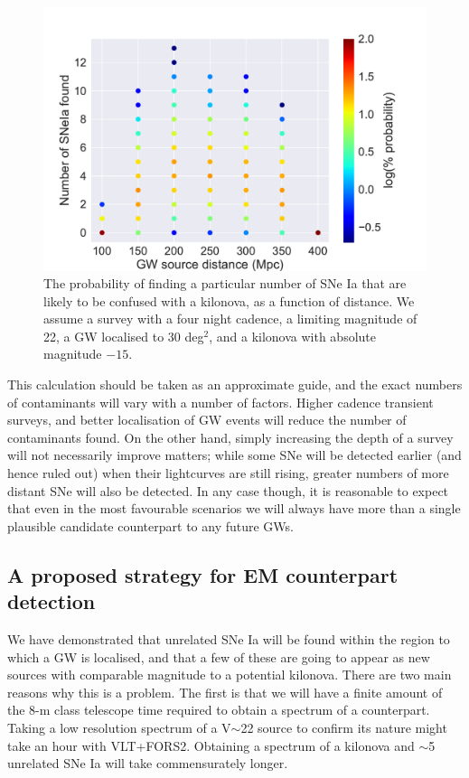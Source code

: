 \documentclass{aa}
\begin{document}
\begin{figure}[h]
\includegraphics[width=\linewidth]{../Figs/SNIa_lim22mag}
\caption{The probability of finding a particular number of SNe Ia that are likely to be confused with a kilonova, as a function of distance. We assume a survey with a four night cadence, a limiting magnitude of 22, a GW localised to 30 deg$^2$, and a kilonova with absolute magnitude $-15$.}
\label{fig:SNIa}
\end{figure}

This calculation should be taken as an approximate guide, and the exact numbers of contaminants will vary with a number of factors. Higher cadence transient surveys, and better localisation of GW events will reduce the number of contaminants found. On the other hand, simply increasing the depth of a survey will not necessarily improve matters; while some SNe will be detected earlier (and hence ruled out) when their lightcurves are still rising, greater numbers of more distant SNe will also be detected. In any case though, it is reasonable to expect that even in the most favourable scenarios we will always have more than a single plausible candidate counterpart to any future GWs.

\subsection{A proposed strategy for EM counterpart detection}

We have demonstrated that unrelated SNe Ia will be found within the region to which a GW is localised, and that a few of these are going to appear as new sources with comparable magnitude to a potential kilonova. There are two main reasons why this is a problem. The first is that we will have a finite amount of the 8-m class telescope time required to obtain a spectrum of a counterpart. Taking a low resolution spectrum of a V$\sim$22 source to confirm its nature might take an hour with VLT+FORS2. Obtaining a spectrum of a kilonova and $\sim$5 unrelated SNe Ia will take commensurately longer.
\end{document}
